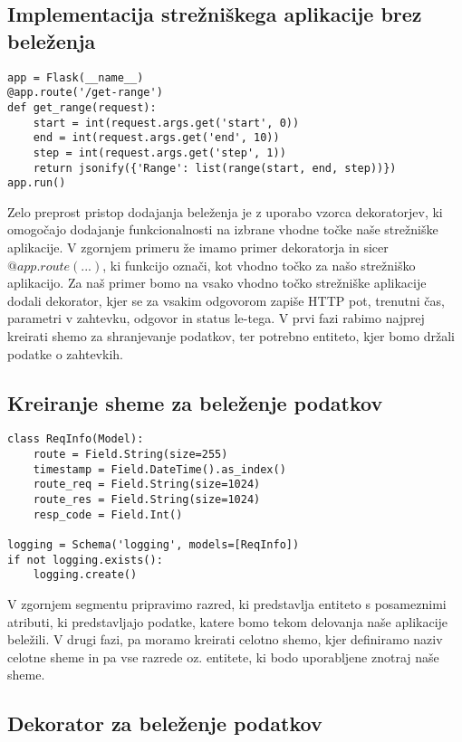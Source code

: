 \documentclass[a4paper,12pt,openright]{book}
\begin{document}
    \subsection{Implementacija strežniškega aplikacije brez beleženja}
\begin{verbatim}
app = Flask(__name__)
@app.route('/get-range')
def get_range(request):
    start = int(request.args.get('start', 0))
    end = int(request.args.get('end', 10))
    step = int(request.args.get('step', 1))
    return jsonify({'Range': list(range(start, end, step))})
app.run()
\end{verbatim}

    \noindent
    Zelo preprost pristop dodajanja beleženja je z uporabo vzorca dekoratorjev, ki omogočajo dodajanje funkcionalnosti na izbrane vhodne točke naše strežniške aplikacije. V zgornjem primeru že imamo primer dekoratorja in sicer $@app.route(...)$, ki funkcijo označi, kot vhodno točko za našo strežniško aplikacijo. Za naš primer bomo na vsako vhodno točko strežniške aplikacije dodali dekorator, kjer se za vsakim odgovorom zapiše HTTP pot, trenutni čas, parametri v zahtevku, odgovor in status le-tega. V prvi fazi rabimo najprej kreirati shemo za shranjevanje podatkov, ter potrebno entiteto, kjer bomo držali podatke o zahtevkih.

    \subsection{Kreiranje sheme za beleženje podatkov}
\begin{verbatim}
class ReqInfo(Model):
    route = Field.String(size=255)
    timestamp = Field.DateTime().as_index()
    route_req = Field.String(size=1024)
    route_res = Field.String(size=1024)
    resp_code = Field.Int()

logging = Schema('logging', models=[ReqInfo])
if not logging.exists():
    logging.create()
\end{verbatim}

    \noindent
    V zgornjem segmentu pripravimo razred, ki predstavlja entiteto s posameznimi atributi, ki predstavljajo podatke, katere bomo tekom delovanja naše aplikacije beležili. V drugi fazi, pa moramo kreirati celotno shemo, kjer definiramo naziv celotne sheme in pa vse razrede oz. entitete, ki bodo uporabljene znotraj naše sheme.

    \newpage
    \subsection{Dekorator za beleženje podatkov}
\end{document}
